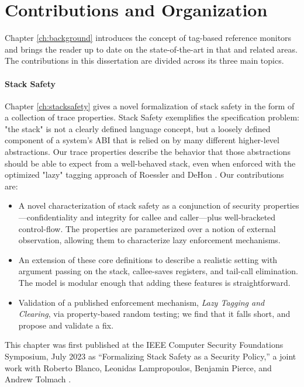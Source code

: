 \documentclass{report}
\begin{document}
\section{Contributions and Organization}

Chapter \ref{ch:background} introduces the concept of tag-based reference monitors
and brings the reader up to date on the state-of-the-art in that and related areas.
The contributions in this dissertation are divided across its three main topics.

\paragraph{Stack Safety}

Chapter \ref{ch:stacksafety} gives a novel formalization of stack safety in the
form of a collection of trace properties. Stack Safety exemplifies the specification problem:
"the stack" is not a clearly defined language concept, but a loosely defined component of
a system's ABI that is relied on by many different higher-level abstractions.
Our trace properties describe the behavior that those abstractions
should be able to expect from a well-behaved stack, even when enforced with the
optimized "lazy" tagging approach of Roessler and DeHon \cite{RoesslerD18}.
Our contributions are:

\begin{itemize}
  \item A novel characterization of stack safety as a conjunction
        of security properties---confidentiality and integrity for callee
        and caller---plus well-bracketed control-flow.
        The properties are parameterized over a notion of
        external observation, allowing them to characterize lazy enforcement
        mechanisms.
  \item An extension of these core definitions to
        describe a realistic setting with argument passing on the stack,
        callee-saves registers, and tail-call elimination. The model is
        modular enough that adding these features is straightforward.
  \item Validation of a published enforcement mechanism,
        \emph{Lazy Tagging and Clearing}, via property-based random testing; we find that
        it falls short, and propose and validate a fix.
\end{itemize}

This chapter was first published at the IEEE Computer Security Foundations Symposium,
July 2023 as ``Formalizing Stack Safety as a Security Policy,'' a
joint work with Roberto Blanco, Leonidas Lampropoulos, Benjamin Pierce, and Andrew Tolmach
\cite{Anderson23:StackSafety}.
\end{document}
